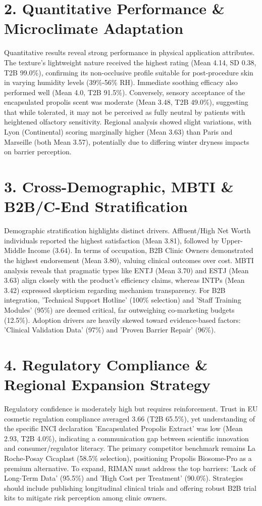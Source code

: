 \documentclass[10pt,twocolumn,a4paper]{article}
\begin{document}
\section{2. Quantitative Performance \& Microclimate Adaptation}
Quantitative results reveal strong performance in physical application attributes. The texture's lightweight nature received the highest rating (Mean 4.14, SD 0.38, T2B 99.0\%), confirming its non-occlusive profile suitable for post-procedure skin in varying humidity levels (39\%-56\% RH). Immediate soothing efficacy also performed well (Mean 4.0, T2B 91.5\%). Conversely, sensory acceptance of the encapsulated propolis scent was moderate (Mean 3.48, T2B 49.0\%), suggesting that while tolerated, it may not be perceived as fully neutral by patients with heightened olfactory sensitivity. Regional analysis showed slight variations, with Lyon (Continental) scoring marginally higher (Mean 3.63) than Paris and Marseille (both Mean 3.57), potentially due to differing winter dryness impacts on barrier perception.
\section{3. Cross-Demographic, MBTI \& B2B/C-End Stratification}
Demographic stratification highlights distinct drivers. Affluent/High Net Worth individuals reported the highest satisfaction (Mean 3.81), followed by Upper-Middle Income (3.64). In terms of occupation, B2B Clinic Owners demonstrated the highest endorsement (Mean 3.80), valuing clinical outcomes over cost. MBTI analysis reveals that pragmatic types like ENTJ (Mean 3.70) and ESTJ (Mean 3.63) align closely with the product's efficiency claims, whereas INTPs (Mean 3.42) expressed skepticism regarding mechanism transparency. For B2B integration, 'Technical Support Hotline' (100\% selection) and 'Staff Training Modules' (95\%) are deemed critical, far outweighing co-marketing budgets (12.5\%). Adoption drivers are heavily skewed toward evidence-based factors: 'Clinical Validation Data' (97\%) and 'Proven Barrier Repair' (96\%).
\section{4. Regulatory Compliance \& Regional Expansion Strategy}
Regulatory confidence is moderately high but requires reinforcement. Trust in EU cosmetic regulation compliance averaged 3.66 (T2B 65.5\%), yet understanding of the specific INCI declaration 'Encapsulated Propolis Extract' was low (Mean 2.93, T2B 4.0\%), indicating a communication gap between scientific innovation and consumer/regulator literacy. The primary competitor benchmark remains La Roche-Posay Cicaplast (58.5\% selection), positioning Propolis Biosome-Pro as a premium alternative. To expand, RIMAN must address the top barriers: 'Lack of Long-Term Data' (95.5\%) and 'High Cost per Treatment' (90.0\%). Strategies should include publishing longitudinal clinical trials and offering robust B2B trial kits to mitigate risk perception among clinic owners.
\end{document}
